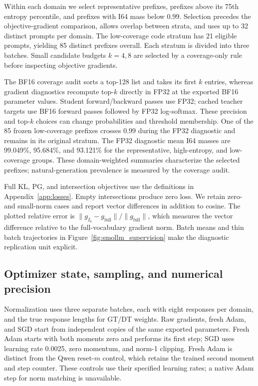 Within each domain we select representative prefixes, prefixes above its 75th entropy percentile, and prefixes with I64 mass below 0.99. Selection precedes the objective-gradient comparison, allows overlap between strata, and uses up to 32 distinct prompts per domain. The low-coverage code stratum has 21 eligible prompts, yielding 85 distinct prefixes overall. Each stratum is divided into three batches. Small candidate budgets $k=4,8$ are selected by a coverage-only rule before inspecting objective gradients.

The BF16 coverage audit sorts a top-128 list and takes its first $k$ entries, whereas gradient diagnostics recompute top-$k$ directly in FP32 at the exported BF16 parameter values. Student forward/backward passes use FP32; cached teacher targets use BF16 forward passes followed by FP32 log-softmax. These precision and top-$k$ choices can change probabilities and threshold membership. One of the 85 frozen low-coverage prefixes crosses 0.99 during the FP32 diagnostic and remains in its original stratum. The FP32 diagnostic mean I64 masses are 99.049\%, 95.684\%, and 93.121\% for the representative, high-entropy, and low-coverage groups. These domain-weighted summaries characterize the selected prefixes; natural-generation prevalence is measured by the coverage audit.

Full KL, PG, and intersection objectives use the definitions in Appendix~\ref{app:losses}. Empty intersections produce zero loss. We retain zero- and small-norm cases and report vector differences in addition to cosine. The plotted relative error is $\|g_{I_k}-g_{\mathrm{full}}\|/\|g_{\mathrm{full}}\|$, which measures the vector difference relative to the full-vocabulary gradient norm. Batch means and thin batch trajectories in Figure~\ref{fig:smollm_supervision} make the diagnostic replication unit explicit.

\subsection{Optimizer state, sampling, and numerical precision}
\label{app:smollm_controls}

Normalization uses three separate batches, each with eight responses per domain, and the true response lengths for GT/DT weights. Raw gradients, fresh Adam, and SGD start from independent copies of the same exported parameters. Fresh Adam starts with both moments zero and performs its first step; SGD uses learning rate 0.0025, zero momentum, and norm-1 clipping. Fresh Adam is distinct from the Qwen reset-$m$ control, which retains the trained second moment and step counter. These controls use their specified learning rates; a native Adam step for norm matching is unavailable.

